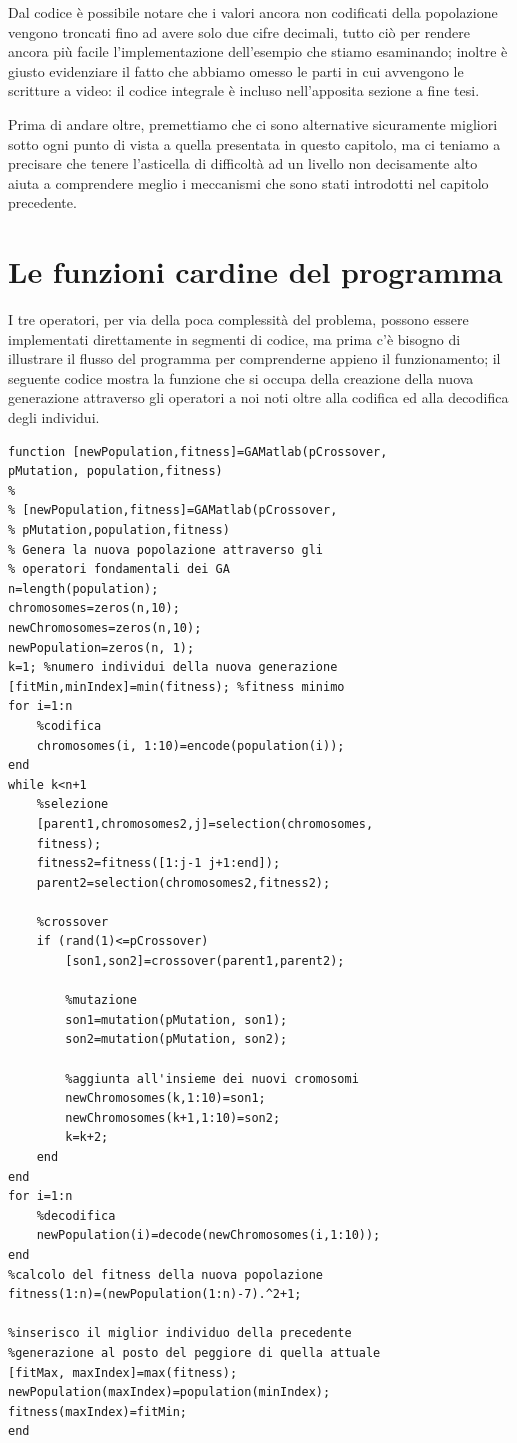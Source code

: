 Dal codice \`e possibile notare che i valori ancora non codificati della popolazione vengono troncati fino ad avere solo due cifre decimali, tutto ci\`o per rendere ancora pi\`u facile l'implementazione dell'esempio che stiamo esaminando; inoltre \`e giusto evidenziare il fatto che  abbiamo omesso le parti in cui avvengono le scritture a video: il codice integrale \`e incluso nell'apposita sezione a fine tesi.
\vspace{3mm}

Prima di andare oltre, premettiamo che ci sono alternative sicuramente migliori sotto ogni punto di vista a quella presentata in questo capitolo, ma ci teniamo a precisare che tenere l'asticella di difficolt\`a ad un livello non decisamente alto aiuta a comprendere meglio i meccanismi che sono stati introdotti nel capitolo precedente.
\section{Le funzioni cardine del programma}
I tre operatori, per via della poca complessit\`a del problema, possono essere implementati direttamente in segmenti di codice, ma prima c'\`e bisogno di illustrare il flusso del programma per comprenderne appieno il funzionamento; il seguente codice mostra la funzione che si occupa della creazione della nuova generazione attraverso gli operatori a noi noti oltre alla codifica ed alla decodifica degli individui.
\begin{lstlisting}[style=matlab, style=matlab2, style=matlab3]
function [newPopulation,fitness]=GAMatlab(pCrossover,
pMutation, population,fitness)
%
% [newPopulation,fitness]=GAMatlab(pCrossover,
% pMutation,population,fitness)
% Genera la nuova popolazione attraverso gli
% operatori fondamentali dei GA
n=length(population);
chromosomes=zeros(n,10); 
newChromosomes=zeros(n,10);
newPopulation=zeros(n, 1);
k=1; %numero individui della nuova generazione
[fitMin,minIndex]=min(fitness); %fitness minimo
for i=1:n
    %codifica
    chromosomes(i, 1:10)=encode(population(i));
end
while k<n+1
    %selezione
    [parent1,chromosomes2,j]=selection(chromosomes,
    fitness);
    fitness2=fitness([1:j-1 j+1:end]);
    parent2=selection(chromosomes2,fitness2);
   
    %crossover
    if (rand(1)<=pCrossover)
        [son1,son2]=crossover(parent1,parent2);
        
        %mutazione
        son1=mutation(pMutation, son1);
        son2=mutation(pMutation, son2);
        
        %aggiunta all'insieme dei nuovi cromosomi
        newChromosomes(k,1:10)=son1;
        newChromosomes(k+1,1:10)=son2;
        k=k+2;
    end
end
for i=1:n
    %decodifica
    newPopulation(i)=decode(newChromosomes(i,1:10));
end
%calcolo del fitness della nuova popolazione
fitness(1:n)=(newPopulation(1:n)-7).^2+1;

%inserisco il miglior individuo della precedente
%generazione al posto del peggiore di quella attuale
[fitMax, maxIndex]=max(fitness);
newPopulation(maxIndex)=population(minIndex);
fitness(maxIndex)=fitMin;
end
\end{lstlisting}
